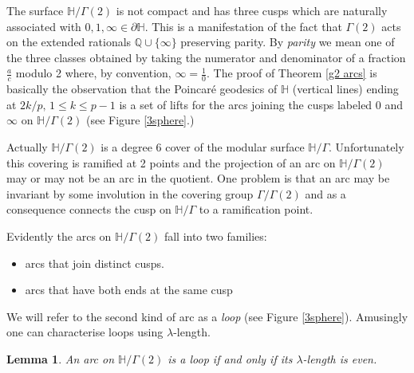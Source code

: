 \documentclass[12pt,a4paper]{amsart}
\newtheorem{lem}[thm]{Lemma}
\def\HH{\mathbb{H}}
\def\g2{\Gamma(2)}
\def\xx{\HH/\g2}
\begin{document}
The surface  $\xx$ is not compact and has three cusps which
are naturally associated with $0,1,\infty \in \partial \mathbb{H}$.
This is a manifestation of the fact that $\g2$ acts on the extended
rationals $\mathbb{Q} \cup \{\infty\}$ preserving parity.
By \textit{parity} we mean one
of the three classes obtained by taking the 
numerator and denominator  of  a fraction $\frac{a}{c}$ modulo 2
where, by convention, $\infty = \frac{1}{0}$.
The proof of Theorem \ref{g2 arcs} is basically the observation that the Poincaré geodesics
of $\mathbb{H}$ (vertical lines) ending at $2k / p,\, 1\leq k \leq
p-1$ is a set of lifts for the arcs joining the cusps labeled $0$ and
$\infty$ on $\xx$ (see Figure \ref{3sphere}.)

Actually $\xx$ is a degree 6 cover of the modular surface
$\mathbb{H}/\Gamma$. 
Unfortunately this covering is ramified at 2 points and
the projection of an arc on $\xx$ may or may not be an arc in the
quotient.
One problem is that an arc may be invariant by some involution
in the covering group $\Gamma / \Gamma(2)$ and as a consequence connects the cusp on
$\mathbb{H}/\Gamma$ to a ramification point.


	




Evidently the arcs on $\xx$ fall into two families:
\begin{itemize}
	\item arcs that join distinct cusps. 
	\item arcs that have both ends at the same cusp
\end{itemize}
We will refer to the second kind of arc as a \textit{loop}
(see Figure \ref{3sphere}).
Amusingly one can characterise loops using $\lambda$-length.
\begin{lem}\label{length parity}
	An arc on $\xx$ is a loop if and only if its
	$\lambda$-length is even.
\end{lem}
\end{document}

